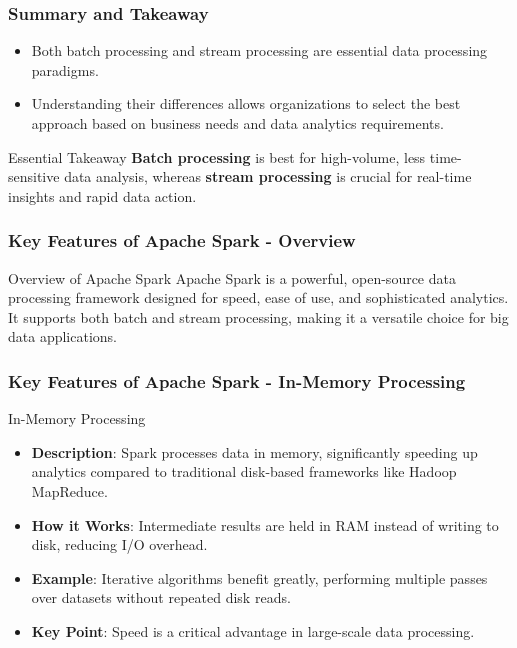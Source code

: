 \documentclass{beamer}
\begin{document}
\begin{frame}[fragile]
    \frametitle{Summary and Takeaway}
    \begin{itemize}
        \item Both batch processing and stream processing are essential data processing paradigms.
        \item Understanding their differences allows organizations to select the best approach based on business needs and data analytics requirements.
    \end{itemize}
    
    \begin{block}{Essential Takeaway}
        \textbf{Batch processing} is best for high-volume, less time-sensitive data analysis, whereas \textbf{stream processing} is crucial for real-time insights and rapid data action.
    \end{block}
\end{frame}

\begin{frame}[fragile]
    \frametitle{Key Features of Apache Spark - Overview}
    \begin{block}{Overview of Apache Spark}
        Apache Spark is a powerful, open-source data processing framework designed for speed, ease of use, and sophisticated analytics. It supports both batch and stream processing, making it a versatile choice for big data applications.
    \end{block}
\end{frame}

\begin{frame}[fragile]
    \frametitle{Key Features of Apache Spark - In-Memory Processing}
    \begin{block}{In-Memory Processing}
        \begin{itemize}
            \item \textbf{Description}: Spark processes data in memory, significantly speeding up analytics compared to traditional disk-based frameworks like Hadoop MapReduce.
            \item \textbf{How it Works}: Intermediate results are held in RAM instead of writing to disk, reducing I/O overhead.
            \item \textbf{Example}: Iterative algorithms benefit greatly, performing multiple passes over datasets without repeated disk reads.
            \item \textbf{Key Point}: Speed is a critical advantage in large-scale data processing.
        \end{itemize}
    \end{block}
\end{frame}
\end{document}
